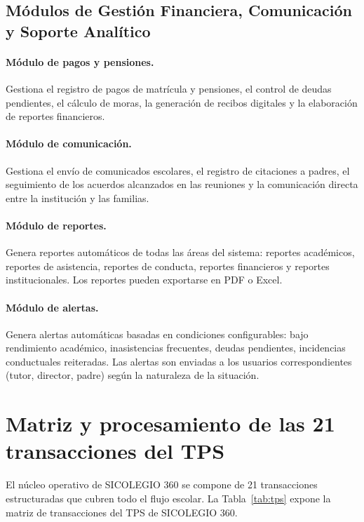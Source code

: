 \documentclass[12pt,a4paper,oneside]{report}
\begin{document}
\subsection{Módulos de Gestión Financiera, Comunicación y Soporte Analítico}

\paragraph{Módulo de pagos y pensiones.} Gestiona el registro de pagos de matrícula y pensiones, el control de deudas pendientes, el cálculo de moras, la generación de recibos digitales y la elaboración de reportes financieros.

\paragraph{Módulo de comunicación.} Gestiona el envío de comunicados escolares, el registro de citaciones a padres, el seguimiento de los acuerdos alcanzados en las reuniones y la comunicación directa entre la institución y las familias.

\paragraph{Módulo de reportes.} Genera reportes automáticos de todas las áreas del sistema: reportes académicos, reportes de asistencia, reportes de conducta, reportes financieros y reportes institucionales. Los reportes pueden exportarse en PDF o Excel.

\paragraph{Módulo de alertas.} Genera alertas automáticas basadas en condiciones configurables: bajo rendimiento académico, inasistencias frecuentes, deudas pendientes, incidencias conductuales reiteradas. Las alertas son enviadas a los usuarios correspondientes (tutor, director, padre) según la naturaleza de la situación.

\section{Matriz y procesamiento de las 21 transacciones del TPS}

El núcleo operativo de SICOLEGIO 360 se compone de 21 transacciones estructuradas que cubren todo el flujo escolar. La Tabla~\ref{tab:tps} expone la matriz de transacciones del TPS de SICOLEGIO 360.
\end{document}

